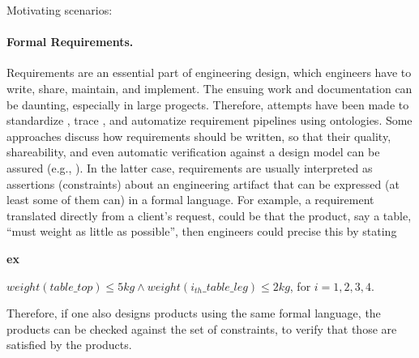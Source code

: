 \documentclass[sw]{iosart2x}
\newcommand{\bflist}{\begin{list}{}{\setlength{\topsep}{2mm}\setlength{\partopsep}{0mm}\setlength{\parsep}{0mm}\setlength{\leftmargin}{9mm}\setlength{\labelwidth}{8mm}}}
\newcommand{\eflist}{\end{list}}
\newcommand{\ExLabel}{\textrm{ex}}
\newcommand{\myex}[1]{\refstepcounter{cntex}\begin{small}{\bf \ExLabel\thecntex\label{ex:#1}}\end{small}}
\newcounter{cntex}
\newcommand{\qquotes}[1]{``#1''}
\newcommand{\TODO}[1]{{\color{red} #1
}}
\begin{document}
{Motivating scenarios:
\paragraph{Formal Requirements.}
Requirements are an essential part of engineering design, which engineers have to write, share, maintain, and implement. 
The ensuing work and documentation can be daunting, especially in large progects. Therefore, attempts have been made to standardize \cite{alrumaihDomainOntologyRequirements2020}, trace \cite{murtazinaOntologybasedApproachSupport2019}, and automatize \cite{holterScopeDetectionTextual2021} requirement pipelines using ontologies. 
Some approaches discuss how requirements should be written, so that their quality, shareability, and even automatic verification against a design model can be assured (e.g., \cite{jinxinlinRequirementOntologyEngineering1996, chenOntologybasedRequirementVerification2020}).
In the latter case, requirements are usually interpreted as assertions (constraints) about an engineering artifact that can be expressed (at least some of them can) in a formal language. 
For example, a requirement translated directly from a client's request, could be that the product, say a table, \qquotes{must weight as little as possible}, then engineers could precise this by stating 
\bflist
  \item[\myex{req1}] $ weight(table\_top) \leq 5kg \land weight(i_{th}\_table\_leg) \leq 2kg$, for $i = 1,2,3,4$. 
\eflist
Therefore, if one also designs products using the same formal language, the products can be checked against the set of constraints, to verify that those are satisfied by the products.

}
\end{document}
